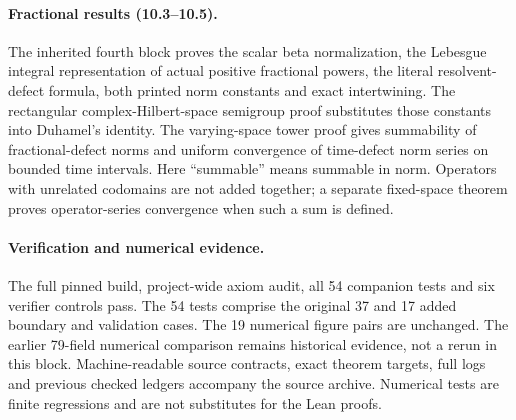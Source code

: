 \paragraph{Fractional results (10.3--10.5).}
The inherited fourth block proves the scalar beta normalization, the Lebesgue
integral representation of actual positive fractional powers, the literal
resolvent-defect formula, both printed norm constants and exact intertwining.
The rectangular complex-Hilbert-space semigroup proof substitutes those constants
into Duhamel's identity. The varying-space tower proof gives summability of
fractional-defect norms and uniform convergence of time-defect norm series on
bounded time intervals. Here ``summable'' means summable in norm. Operators with
unrelated codomains are not added together; a separate fixed-space theorem proves
operator-series convergence when such a sum is defined.

\paragraph{Verification and numerical evidence.}
The full pinned build, project-wide axiom audit, all 54 companion tests and six
verifier controls pass. The 54 tests comprise the original 37 and 17 added boundary
and validation cases. The 19 numerical figure pairs are unchanged. The earlier
79-field numerical comparison remains historical evidence, not a rerun in this
block. Machine-readable source contracts, exact theorem targets, full logs and
previous checked ledgers accompany the source archive. Numerical tests are finite
regressions and are not substitutes for the Lean proofs.
